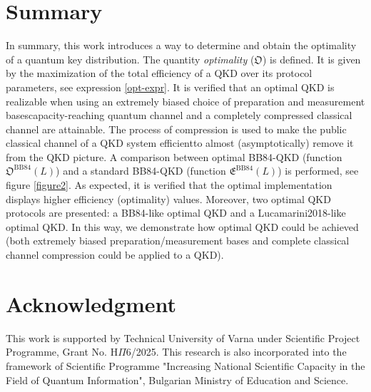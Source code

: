 \documentclass[journal,onecolumn]{IEEEtran}
\theoremstyle{thmstyleone}%
\theoremstyle{thmstyletwo}%
\theoremstyle{thmstylethree}%
\begin{document}
	\section{Summary}\label{summary}
	In summary, this work introduces a way to determine and obtain the optimality of a quantum key distribution. The quantity \textit{optimality} ($\mathfrak{O}$) is defined. It is given by the maximization of the total efficiency of a QKD over its protocol parameters, see expression \eqref{opt-expr}. It is verified that an optimal QKD is realizable when using an extremely biased choice of preparation and measurement bases\textemdash capacity-reaching quantum channel and a completely compressed classical channel are attainable. The process of compression is used to make the public classical channel of a QKD system efficient\textemdash to almost (asymptotically) remove it from the QKD picture.
	A comparison between optimal BB84-QKD (function $\mathfrak{O}^{\text{BB84}}(L)$) and a standard BB84-QKD (function $\mathfrak{E}^{\text{BB84}}(L)$) is performed, see figure \ref{figure2}. As expected, it is verified that the optimal implementation displays higher efficiency (optimality) values.
	Moreover, two optimal QKD protocols are presented: a BB84-like optimal QKD and a Lucamarini2018-like optimal QKD. In this way, we demonstrate how optimal QKD  could be achieved (both extremely biased preparation/measurement bases \cite{Lo2005} and complete classical channel compression could be applied to a QKD).
	
	\section*{Acknowledgment}
	This work is supported by Technical University of Varna under Scientific Project Programme, Grant No. $\text{H}\Pi$6/2025. This research is also incorporated into the framework of Scientific Programme "Increasing National Scientific Capacity in the Field of Quantum Information", Bulgarian Ministry of Education and Science.
	
	
	
	
	
	
	
	
	
	
	
	
	
	
	
\end{document}
